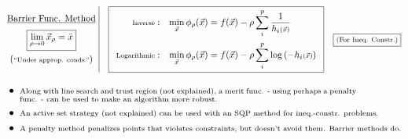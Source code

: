 \documentclass[12pt]{article}
\begin{document}
\vspace{10pt}
\( 
    \begin{gathered}
        \underline{\text{Barrier Func. Method}}\\[2pt]
        \boxed{ \lim_{\rho \rightarrow 0} \vec{x}_\rho = \bar{x} }\\
        (\text{\scriptsize ``Under approp. conds.''})
    \end{gathered}
    \ \vline \ \ \ 
    \boxed{
        \begin{array}{r l}
            \begin{gathered}
                \text{\scriptsize Inverse}
            \end{gathered} :
                &\displaystyle \min_{\vec{x}} \phi_\rho(\vec{x}) = f(\vec{x}) 
                - \rho \sum_i^p \frac{1}{ h_i{\scriptstyle(\vec{x})} }
                \\[15pt]
            \begin{gathered}
                \text{\scriptsize Logarithmic}
            \end{gathered} :
                &\displaystyle \min_{\vec{x}} \phi_\rho(\vec{x}) = f(\vec{x}) 
                - \rho \sum_i^p \log{ ( -h_i{\scriptstyle(\vec{x})} ) }
        \end{array}
    }
    \hspace{10pt}
    \boxed{ \text{\scriptsize(For Ineq. Constr.)} }
\)

\vspace{5pt}
\(\begin{aligned}
    &\bullet\ \parbox[t]{.95\textwidth}{\scriptsize Along with line search and trust region (not explained), 
        a merit func. - using perhaps a penalty func. - can be used to make an algorithm more robust.}
        \\
    &\bullet\ \text{\scriptsize An active set strategy (not explained) can be used with an SQP method 
        for ineq.-constr. problems.}
        \\
    &\bullet\ \text{\scriptsize A penalty method penalizes points that violates constraints, 
        but doesn't avoid them. Barrier methods do.}
\end{aligned}\)
\end{document}
